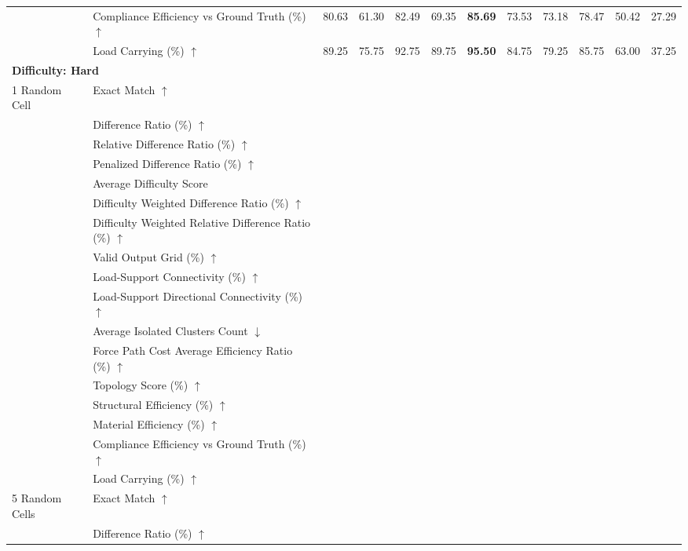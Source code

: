 \begin{table}[!h]
{\begin{tabular}{llllllllllll}
 & Compliance Efficiency vs Ground Truth (\%) $\uparrow$ & 80.63 & 61.30 & 82.49 & 69.35 & \textbf{85.69} & 73.53 & 73.18 & 78.47 & 50.42 & 27.29 \\
 & Load Carrying (\%) $\uparrow$ & 89.25 & 75.75 & 92.75 & 89.75 & \textbf{95.50} & 84.75 & 79.25 & 85.75 & 63.00 & 37.25 \\
\midrule
\multicolumn{12}{l}{\textbf{Difficulty: Hard}}\\
\midrule
1 Random Cell & Exact Match $\uparrow$ &  &  &  &  &  &  &  &  &  &  \\
 & Difference Ratio (\%) $\uparrow$ &  &  &  &  &  &  &  &  &  &  \\
 & Relative Difference Ratio (\%) $\uparrow$ &  &  &  &  &  &  &  &  &  &  \\
 & Penalized Difference Ratio (\%) $\uparrow$ &  &  &  &  &  &  &  &  &  &  \\
 & Average Difficulty Score &  &  &  &  &  &  &  &  &  &  \\
 & Difficulty Weighted Difference Ratio (\%) $\uparrow$ &  &  &  &  &  &  &  &  &  &  \\
 & Difficulty Weighted Relative Difference Ratio (\%) $\uparrow$ &  &  &  &  &  &  &  &  &  &  \\
 & Valid Output Grid (\%) $\uparrow$ &  &  &  &  &  &  &  &  &  &  \\
 & Load-Support Connectivity (\%) $\uparrow$ &  &  &  &  &  &  &  &  &  &  \\
 & Load-Support Directional Connectivity (\%) $\uparrow$ &  &  &  &  &  &  &  &  &  &  \\
 & Average Isolated Clusters Count $\downarrow$ &  &  &  &  &  &  &  &  &  &  \\
 & Force Path Cost Average Efficiency Ratio (\%) $\uparrow$ &  &  &  &  &  &  &  &  &  &  \\
 & Topology Score (\%) $\uparrow$ &  &  &  &  &  &  &  &  &  &  \\
 & Structural Efficiency (\%) $\uparrow$ &  &  &  &  &  &  &  &  &  &  \\
 & Material Efficiency (\%) $\uparrow$ &  &  &  &  &  &  &  &  &  &  \\
 & Compliance Efficiency vs Ground Truth (\%) $\uparrow$ &  &  &  &  &  &  &  &  &  &  \\
 & Load Carrying (\%) $\uparrow$ &  &  &  &  &  &  &  &  &  &  \\
5 Random Cells & Exact Match $\uparrow$ &  &  &  &  &  &  &  &  &  &  \\
 & Difference Ratio (\%) $\uparrow$ &  &  &  &  &  &  &  &  &  &  \\

\end{tabular}}
\end{table}
